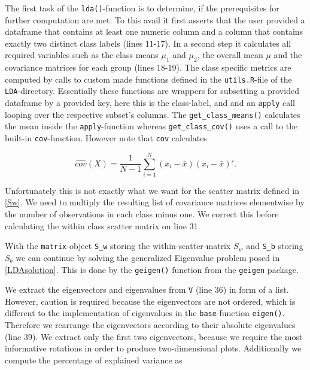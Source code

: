 \documentclass{article}
\begin{document}
The first task of the \texttt{lda()}-function is to determine, if the prerequisites for further computation are met. To this avail it first asserts that the user provided a dataframe that contains at least one numeric column and a column that contains exactly two distinct class labels (lines 11-17). In a second step it calculates all required variables such as the class means $\mu_1$ and $\mu_2$, the overall mean $\mu$ and the covariance matrices for each group (lines 18-19). The class specific metrics are computed by calls to custom made functions defined in the \texttt{utils.R}-file of the \texttt{LDA}-directory. Essentially these functions are wrappers for subsetting a provided dataframe by a provided key, here this is the class-label, and and an \texttt{apply} call looping over the respective subset's columns. The \texttt{get\_class\_means()} calculates the mean inside the \texttt{apply}-function whereas \texttt{get\_class\_cov()} uses a call to the built-in \texttt{cov}-function. However note that \texttt{cov} calculates 

$$\hat{cov}(X) = \frac{1}{N-1} \sum_{i = 1}^{N}(x_i - \bar{x})(x_i - \bar{x})\prime.$$

Unfortunately this is not exactly what we want for the scatter matrix defined in \ref{Sw}. We need to multiply the resulting list of covariance matrices elementwise by the number of observations in each class minus one. We correct this before calculating the within class scatter matrix on line 31. 



With the \texttt{matrix}-object \texttt{S\_w} storing the within-scatter-matrix $S_w$ and \texttt{S\_b} storing $S_b$ we can continue by solving the generalized Eigenvalue problem posed in \ref{LDAsolution}. This is done by the \texttt{geigen()} function from the \texttt{geigen} package.
\newpage


We extract the eigenvectors and eigenvalues from \texttt{V} (line 36) in form of a list. However, caution is required because the eigenvectors are not ordered, which is different to the implementation of eigenvalues in the \texttt{base}-function \texttt{eigen()}. Therefore we rearrange the eigenvectors according to their absolute eigenvalues (line 39). We extract only the first two eigenvectors, because we require the most informative rotations in order to produce two-dimensional plots. Additionally we compute the percentage of explained variance as 
\end{document}
